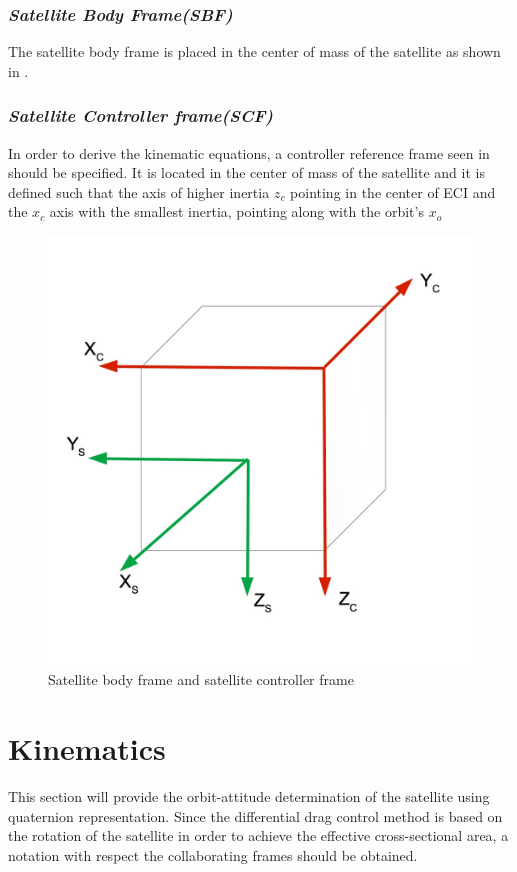 \subsubsection{\textit{Satellite Body Frame(SBF)}}
The satellite body frame is placed in the center of mass of the satellite as shown in  . 
\subsubsection{\textit{Satellite Controller frame(SCF)}}
In order to derive the kinematic equations, a controller reference frame seen in  should be specified. It is located in the center of mass of the satellite and it is defined such that the axis of higher inertia $z_{c}$ pointing in the center of ECI and the $x_{c}$ axis with the smallest inertia, pointing along with  the orbit's $x_{o}$ 
\begin{figure}[H]
\centering
\includegraphics[width=0.4\linewidth]{figures/frames}
\caption{Satellite body frame and satellite controller frame}
\label{fig:frames}
\end{figure}
\section{Kinematics}
This section will provide the orbit-attitude determination of the satellite using quaternion representation. Since the differential drag control method is based on the rotation of the satellite in order to achieve the effective cross-sectional area, a notation with respect the collaborating frames should be obtained.     
%
